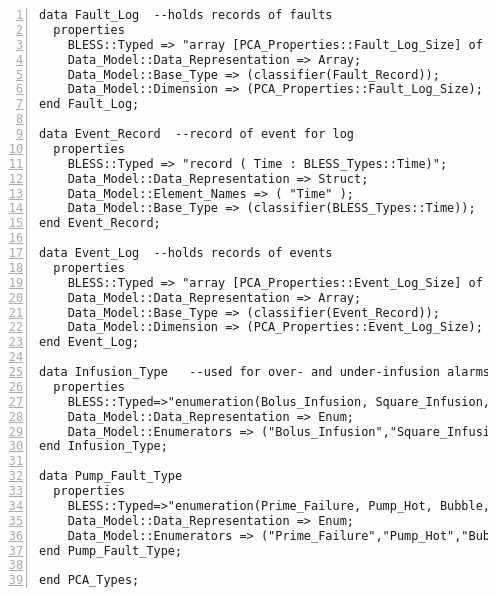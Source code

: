 \begin{lstlisting}[language=aadl, gobble=0, numbers=left, caption={\lstinline{PCA_Types} package}, label={listing:aadl:pca_types}]
data Fault_Log  --holds records of faults
  properties    
    BLESS::Typed => "array [PCA_Properties::Fault_Log_Size] of PCA_Types::Fault_Record";
    Data_Model::Data_Representation => Array;
    Data_Model::Base_Type => (classifier(Fault_Record));
    Data_Model::Dimension => (PCA_Properties::Fault_Log_Size);
end Fault_Log;

data Event_Record  --record of event for log
  properties
  	BLESS::Typed => "record ( Time : BLESS_Types::Time)";
  	Data_Model::Data_Representation => Struct;
    Data_Model::Element_Names => ( "Time" );
    Data_Model::Base_Type => (classifier(BLESS_Types::Time));
end Event_Record;  

data Event_Log  --holds records of events
  properties
    BLESS::Typed => "array [PCA_Properties::Event_Log_Size] of PCA_Types::Event_Record";
    Data_Model::Data_Representation => Array;
    Data_Model::Base_Type => (classifier(Event_Record));
    Data_Model::Dimension => (PCA_Properties::Event_Log_Size);
end Event_Log;

data Infusion_Type   --used for over- and under-infusion alarms
  properties
    BLESS::Typed=>"enumeration(Bolus_Infusion, Square_Infusion, Basal_Infusion, KVO_Infusion)";
    Data_Model::Data_Representation => Enum;
    Data_Model::Enumerators => ("Bolus_Infusion","Square_Infusion","Basal_Infusion","KVO_Infusion");
end Infusion_Type;  
  
data Pump_Fault_Type
  properties
    BLESS::Typed=>"enumeration(Prime_Failure, Pump_Hot, Bubble, Upstream_Occlusion_Fault, Downstream_Occlusion_Fault, Overinfusion, Underinfusion)";
    Data_Model::Data_Representation => Enum;
    Data_Model::Enumerators => ("Prime_Failure","Pump_Hot","Bubble","Upstream_Occlusion_Fault","Downstream_Occlusion_Fault","Overinfusion","Underinfusion" );
end Pump_Fault_Type;

end PCA_Types;
\end{lstlisting} 
\doublespacing

